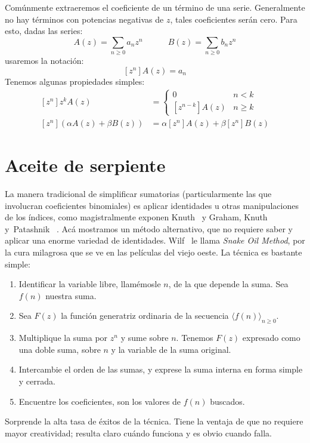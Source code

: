   Comúnmente extraeremos el coeficiente de un término de una serie.
  Generalmente no hay términos con potencias negativas de \(z\),
  tales coeficientes serán cero.
  Para esto,
  dadas las series:
  \begin{equation*}
    A(z)
      = \sum_{n \ge 0} a_n z^n
    \hspace{3em}
    B(z)
      = \sum_{n \ge 0} b_n z^n
  \end{equation*}
  usaremos la notación:
  \begin{equation*}
     \left[ z^n \right] A(z) = a_n
  \end{equation*}
  Tenemos algunas propiedades simples:
  \begin{align*}
    \left[ z^n \right] z^k A(z)
      &= \begin{cases}
           0				  & n < k \\
           \left[ z^{n - k} \right] A(z)  & n \ge k
         \end{cases} \\
    \left[ z^n \right] (\alpha A(z) + \beta B(z))
      &= \alpha \left[ z^n \right] A(z)
           + \beta \left[ z^n \right] B(z)
  \end{align*}

\section{Aceite de serpiente}
\label{sec:snake-oil}

  La manera tradicional de simplificar sumatorias
  (particularmente las que involucran coeficientes binomiales)
  es aplicar identidades u otras manipulaciones de los índices,
  como magistralmente exponen Knuth~%
    \cite{knuth97:_fundam_algor}
  y Graham, Knuth y~Patashnik~%
    \cite{graham94:_concr_mathem}.
  Acá mostramos un método alternativo,
  que no requiere saber y aplicar
  una enorme variedad de identidades.
  Wilf~%
    \cite{wilf06:_gfology}
  le llama \emph{\foreignlanguage{english}{Snake Oil Method}},
  por la cura milagrosa que se ve en las películas del viejo oeste.
  La técnica es bastante simple:
  \begin{enumerate}
  \item
    Identificar la variable libre,
    llamémosle \(n\),
    de la que depende la suma.
    Sea \(f(n)\) nuestra suma.
  \item
    Sea \(F(z)\) la función generatriz ordinaria
    de la secuencia \(\langle f(n) \rangle_{n \ge 0}\).
  \item
    Multiplique la suma por \(z^n\) y sume sobre \(n\).
    Tenemos \(F(z)\) expresado como una doble suma,
    sobre \(n\) y la variable de la suma original.
  \item
    Intercambie el orden de las sumas,
    y exprese la suma interna en forma simple y cerrada.
  \item
    Encuentre los coeficientes,
    son los valores de \(f(n)\) buscados.
  \end{enumerate}
  Sorprende la alta tasa de éxitos de la técnica.
  Tiene la ventaja de que no requiere mayor creatividad;
  resulta claro cuándo funciona
  y es obvio cuando falla.

